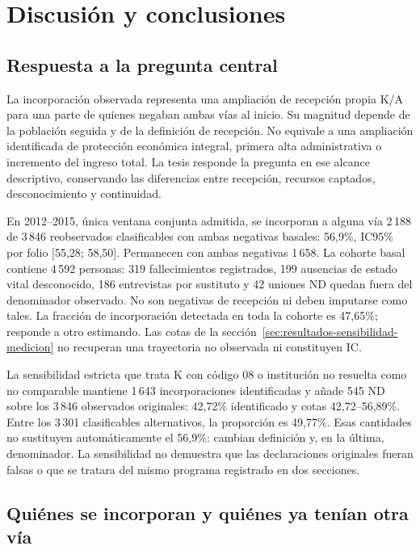 \chapter{Discusión y conclusiones}
\label{cap:discusion}

\section{Respuesta a la pregunta central}

La incorporación observada representa una ampliación de recepción propia K/A
para una parte de quienes negaban ambas vías al inicio. Su magnitud depende
de la población seguida y de la definición de recepción. No equivale a una
ampliación identificada de protección económica integral, primera alta
administrativa o incremento del ingreso total. La tesis responde la pregunta
en ese alcance descriptivo, conservando las diferencias entre recepción,
recursos captados, desconocimiento y continuidad.

En 2012--2015, única ventana conjunta admitida, se incorporan a alguna vía
2\,188 de 3\,846 reobservados clasificables con ambas negativas basales:
56{,}9\%, IC95\% por folio [55{,}28; 58{,}50]. Permanecen con ambas negativas
1\,658. La cohorte basal contiene 4\,592 personas: 319 fallecimientos
registrados, 199 ausencias de estado vital desconocido, 186 entrevistas por
sustituto y 42 uniones ND quedan fuera del denominador observado. No son
negativas de recepción ni deben imputarse como tales. La fracción de
incorporación detectada en toda la cohorte es 47{,}65\%; responde a otro
estimando. Las cotas de la sección~\ref{sec:resultados-sensibilidad-medicion}
no recuperan una trayectoria no observada ni constituyen IC.

La sensibilidad estricta que trata K con código 08 o institución no resuelta
como no comparable mantiene 1\,643 incorporaciones identificadas y añade 545
ND sobre los 3\,846 observados originales: 42{,}72\% identificado y cotas
42{,}72--56{,}89\%. Entre los 3\,301 clasificables alternativos, la proporción
es 49{,}77\%. Esas cantidades no sustituyen automáticamente el 56{,}9\%:
cambian definición y, en la última, denominador. La sensibilidad no demuestra
que las declaraciones originales fueran falsas o que se tratara del mismo
programa registrado en dos secciones.

\section{Quiénes se incorporan y quiénes ya tenían otra vía}

